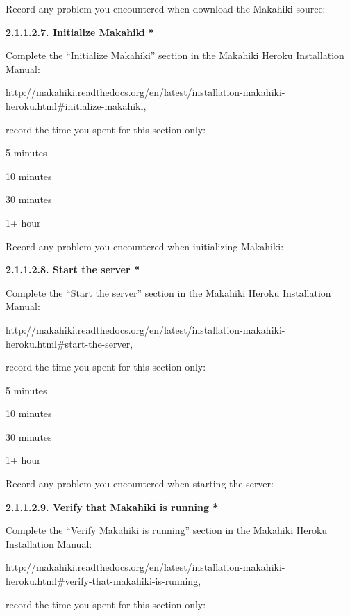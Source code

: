 Record any problem you encountered when download the Makahiki source: \underline{\hspace{3cm}}

{\bf 2.1.1.2.7. Initialize Makahiki *}

Complete the ``Initialize Makahiki'' section in the Makahiki Heroku Installation Manual:

http://makahiki.readthedocs.org/en/latest/installation-makahiki-heroku.html\#initialize-makahiki, 

record the time you spent for this section only:

\begin{radiobutton}
\item 5 minutes
\item  10 minutes
\item  30 minutes
\item  1+ hour
\end{radiobutton}

Record any problem you encountered when initializing Makahiki: \underline{\hspace{4cm}}

{\bf 2.1.1.2.8. Start the server *}

Complete the ``Start the server'' section in the Makahiki Heroku Installation Manual:

http://makahiki.readthedocs.org/en/latest/installation-makahiki-heroku.html\#start-the-server, 

record the time you spent for this section only:

\begin{radiobutton}
\item 5 minutes
\item  10 minutes
\item  30 minutes
\item  1+ hour
\end{radiobutton}

Record any problem you encountered when starting the server: \underline{\hspace{4cm}}

{\bf 2.1.1.2.9. Verify that Makahiki is running *}

Complete the ``Verify Makahiki is running'' section in the Makahiki Heroku Installation Manual:

http://makahiki.readthedocs.org/en/latest/installation-makahiki-heroku.html\#verify-that-makahiki-is-running, 

record the time you spent for this section only:

